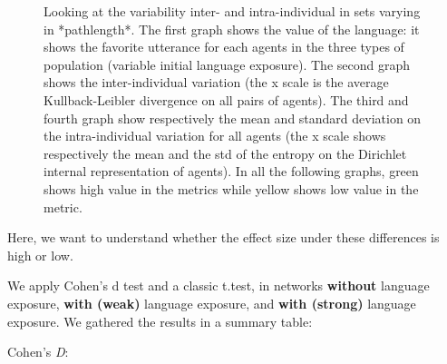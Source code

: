 \documentclass[
]{article}
\begin{document}
\begin{figure}[!H]
{}

\caption{Looking at the variability inter- and intra-individual in sets varying in *pathlength*. The first graph shows the value of the language: it shows the favorite utterance for each agents in the three types of population (variable initial language exposure). The second graph shows the  inter-individual variation (the x scale is the average Kullback-Leibler divergence on all pairs of agents). The third and fourth graph show respectively the mean and standard deviation on the intra-individual variation for all agents (the x scale shows respectively the mean and the std of the entropy on the Dirichlet internal representation of agents). In all the following graphs, green shows high value in the metrics while yellow shows low value in the metric.}\label{fig:unnamed-chunk-6}
\end{figure}

Here, we want to understand whether the effect size under these
differences is high or low.

We apply Cohen's d test and a classic t.test, in networks
\textbf{without} language exposure, \textbf{with (weak)} language
exposure, and \textbf{with (strong)} language exposure. We gathered the
results in a summary table:

Cohen's \emph{D}:
\end{document}
